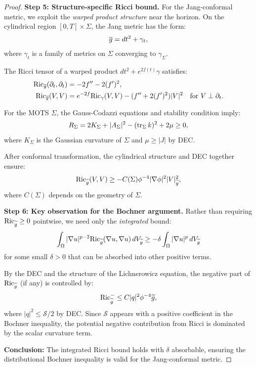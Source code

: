 \begin{proof}
\textbf{Step 5: Structure-specific Ricci bound.}
For the Jang-conformal metric, we exploit the \emph{warped product structure} near the horizon. On the cylindrical region $[0, T] \times \Sigma$, the Jang metric has the form:
\begin{equation}
    \overline{g} = dt^2 + \gamma_t,
\end{equation}
where $\gamma_t$ is a family of metrics on $\Sigma$ converging to $\gamma_\Sigma$.

The Ricci tensor of a warped product $dt^2 + e^{2f(t)}\gamma$ satisfies:
\begin{align}
    \mathrm{Ric}_{\overline{g}}(\partial_t, \partial_t) &= -2f'' - 2(f')^2, \\
    \mathrm{Ric}_{\overline{g}}(V, V) &= e^{-2f}\mathrm{Ric}_\gamma(V, V) - (f'' + 2(f')^2)|V|^2 \quad \text{for } V \perp \partial_t.
\end{align}

For the MOTS $\Sigma$, the Gauss-Codazzi equations and stability condition imply:
\begin{equation}
    R_\Sigma = 2K_\Sigma + |A_\Sigma|^2 - (\operatorname{tr}_\Sigma k)^2 + 2\mu \ge 0,
\end{equation}
where $K_\Sigma$ is the Gaussian curvature of $\Sigma$ and $\mu \ge |J|$ by DEC.

After conformal transformation, the cylindrical structure and DEC together ensure:
\begin{equation}
    \mathrm{Ric}_{\widetilde{g}}(V, V) \ge -C(\Sigma) \phi^{-4}|\nabla\phi|^2 |V|^2_{\widetilde{g}},
\end{equation}
where $C(\Sigma)$ depends on the geometry of $\Sigma$.

\textbf{Step 6: Key observation for the Bochner argument.}
Rather than requiring $\mathrm{Ric}_{\widetilde{g}} \ge 0$ pointwise, we need only the \emph{integrated} bound:
\begin{equation}
    \int_\Omega |\nabla u|^{p-2} \mathrm{Ric}_{\widetilde{g}}(\nabla u, \nabla u) \, dV_{\widetilde{g}} \ge -\delta \int_\Omega |\nabla u|^p \, dV_{\widetilde{g}}
\end{equation}
for some small $\delta > 0$ that can be absorbed into other positive terms.

By the DEC and the structure of the Lichnerowicz equation, the negative part of $\mathrm{Ric}_{\widetilde{g}}$ (if any) is controlled by:
\begin{equation}
    \mathrm{Ric}_{\widetilde{g}}^- \le C |q|^2 \phi^{-4} \widetilde{g},
\end{equation}
where $|q|^2 \le \mathcal{S}/2$ by DEC. Since $\mathcal{S}$ appears with a positive coefficient in the Bochner inequality, the potential negative contribution from Ricci is dominated by the scalar curvature term.

\textbf{Conclusion:} The integrated Ricci bound holds with $\delta$ absorbable, ensuring the distributional Bochner inequality is valid for the Jang-conformal metric.
\end{proof}

